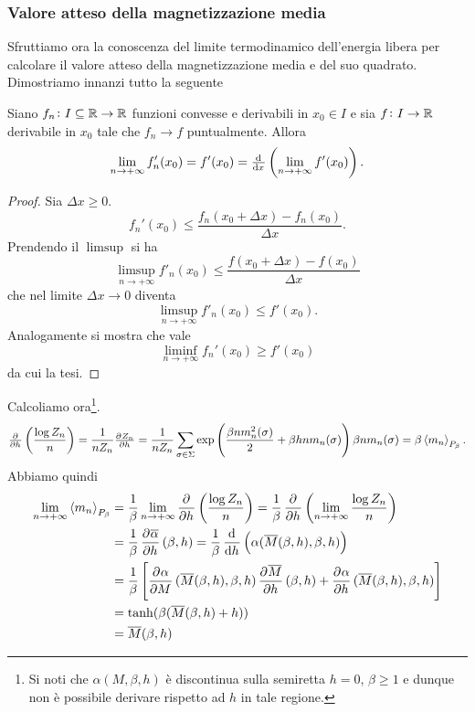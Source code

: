 \subsubsection{Valore atteso della magnetizzazione media}
Sfruttiamo ora la conoscenza del limite termodinamico dell'energia libera per calcolare il valore atteso della magnetizzazione media e del suo quadrato. Dimostriamo innanzi tutto la seguente
\begin{proposition}
    Siano $ f_n\colon I\subseteq\mathbb{R} \to \mathbb{R} $ funzioni convesse e derivabili in $ x_0 \in I $ e sia $ f\colon I\to\mathbb{R} $ derivabile in $ x_0 $ tale che $ f_n \to f $ puntualmente. Allora
    \[ \lim_{n \to +\infty} f_n'(x_0) = f'(x_0) = \od{}{x} \left( \lim_{n \to +\infty} f'(x_0) \right). \]
\end{proposition}
\begin{proof}\label{prop:convessascambio}
    Sia $ \Delta x \geq 0 $.
    \[ f_n'(x_0) \leq \frac{f_n(x_0+\Delta x)-f_n(x_0)}{\Delta x}. \]
    Prendendo il $ \limsup $ si ha
    \[ \limsup_{n\to +\infty} f'_n(x_0) \leq \frac{f(x_0+\Delta x)-f(x_0)}{\Delta x} \]
    che nel limite $ \Delta x \to 0 $ diventa
    \[ \limsup_{n\to +\infty} f'_n(x_0) \leq f'(x_0). \]
    Analogamente si mostra che vale
    \[ \liminf_{n\to +\infty} f_n'(x_0) \geq f'(x_0) \]
    da cui la tesi.
\end{proof}
Calcoliamo ora\footnote{Si noti che $ \alpha(M,\beta,h) $ è discontinua sulla semiretta $ h=0 $, $ \beta \geq 1 $ e dunque non è possibile derivare rispetto ad $ h $ in tale regione.}.
\[ \pd{}{h}\left(\frac{\log Z_n}{n}\right) = \frac{1}{n Z_n} \pd{Z_n}{h} = \frac{1}{nZ_n}\sum_{\sigma \in \Sigma} \exp\left( \frac{\beta n m_n^2(\sigma)}{2} + \beta h n m_n(\sigma) \right) \beta n m_n(\sigma) = \beta \mean{m_n}_{P_\beta}. \]
Abbiamo quindi
\begin{align}
	\label{eq:limmagnmedia}
    \lim_{n \to +\infty}\mean{m_n}_{P_\beta} & = \frac{1}{\beta} \lim_{n \to +\infty} \dpd{}{h}\left(\frac{\log Z_n}{n}\right) = \frac{1}{\beta} \dpd{}{h} \left( \lim_{n \to +\infty} \frac{\log Z_n}{n} \right) \nonumber \\
	                                         & = \frac{1}{\beta} \dpd{\overline{\alpha}}{h}(\beta, h) = \frac{1}{\beta} \dod{}{h} \left( \alpha(\overline{M}(\beta,h), \beta, h)\right) \nonumber \\
                                             & = \frac{1}{\beta} \left[ \dpd{\alpha}{M}(\overline{M}(\beta,h),\beta,h) \dpd{\overline{M}}{h}(\beta,h) + \dpd{\alpha}{h}(\overline{M}(\beta,h),\beta,h) \right] \nonumber \\
                                             & = \tanh(\beta(\overline{M}(\beta,h)+h))  \nonumber \\
                                             & = \overline{M}(\beta, h)
\end{align}
